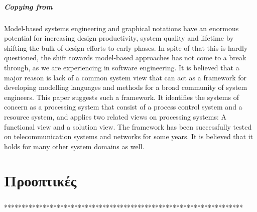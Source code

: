 \documentclass[a4paper,12pt,twoside]{report}
\begin{document}
			\paragraph{Copying from \cite{ProcessingSysPar}} {Model-based systems engineering and graphical notations have an enormous potential for increasing design productivity, system quality and lifetime by shifting the bulk of design efforts to early phases. In spite of that this is hardly questioned, the shift towards model-based approaches has not come to a break through, as we are experiencing in software engineering. It is believed that a major reason is lack of a common system view that can act as a framework for developing modelling languages and methods for a broad community of system engineers. This paper suggests such a framework. It identifies the systems of concern as a processing system that consist of a process control system and a resource system, and applies two related views on processing systems: A functional view and a solution view. The framework has been successfully tested on telecommunication systems and networks for some years. It is believed that it holds for many other system domains as well.
			}

	\chapter{Προοπτικές}
		\label{κεφ.:Προοπτικές}
		
		\paragraph{} {********************************************************************
		}
\end{document}

